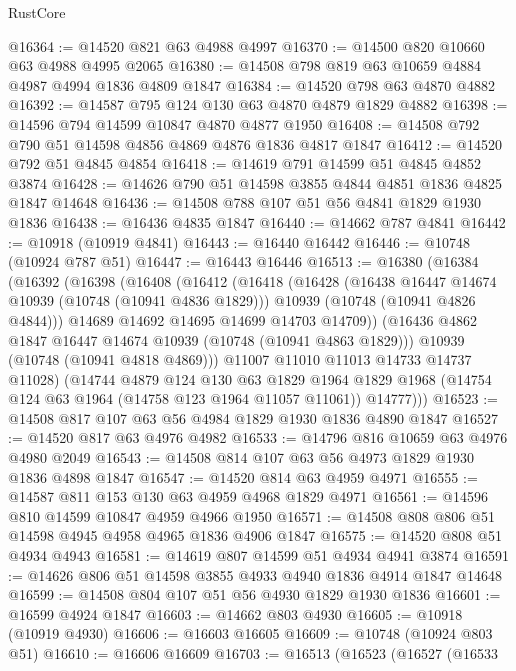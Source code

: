 \begin{lexlean}{RustCore}
\begin{coremodule}
@16364 := @14520 @821 @63 @4988 @4997
@16370 := @14500 @820 @10660 @63 @4988 @4995 @2065
@16380 := @14508 @798 @819 @63 @10659 @4884 @4987 @4994 @1836 @4809 @1847
@16384 := @14520 @798 @63 @4870 @4882
@16392 := @14587 @795 @124 @130 @63 @4870 @4879 @1829 @4882
@16398 := @14596 @794 @14599 @10847 @4870 @4877 @1950
@16408 := @14508 @792 @790 @51 @14598 @4856 @4869 @4876 @1836 @4817 @1847
@16412 := @14520 @792 @51 @4845 @4854
@16418 := @14619 @791 @14599 @51 @4845 @4852 @3874
@16428 := @14626 @790 @51 @14598 @3855 @4844 @4851 @1836 @4825 @1847 @14648
@16436 := @14508 @788 @107 @51 @56 @4841 @1829 @1930 @1836
@16438 := @16436 @4835 @1847
@16440 := @14662 @787 @4841
@16442 := @10918 (@10919 @4841)
@16443 := @16440 @16442
@16446 := @10748 (@10924 @787 @51)
@16447 := @16443 @16446
@16513 := @16380
    (@16384
      (@16392
        (@16398
          (@16408
            (@16412
              (@16418
                (@16428
                  (@16438 @16447 @14674 @10939 (@10748 (@10941 @4836 @1829)))
                  @10939
                  (@10748 (@10941 @4826 @4844)))
                @14689
                @14692
                @14695
                @14699
                @14703
                @14709))
            (@16436 @4862 @1847 @16447 @14674 @10939 (@10748 (@10941 @4863 @1829)))
            @10939
            (@10748 (@10941 @4818 @4869)))
          @11007
          @11010
          @11013
          @14733
          @14737
          @11028)
        (@14744
          @4879
          @124
          @130
          @63
          @1829
          @1964
          @1829
          @1968
          (@14754 @124 @63 @1964 (@14758 @123 @1964 @11057 @11061))
          @14777)))
@16523 := @14508 @817 @107 @63 @56 @4984 @1829 @1930 @1836 @4890 @1847
@16527 := @14520 @817 @63 @4976 @4982
@16533 := @14796 @816 @10659 @63 @4976 @4980 @2049
@16543 := @14508 @814 @107 @63 @56 @4973 @1829 @1930 @1836 @4898 @1847
@16547 := @14520 @814 @63 @4959 @4971
@16555 := @14587 @811 @153 @130 @63 @4959 @4968 @1829 @4971
@16561 := @14596 @810 @14599 @10847 @4959 @4966 @1950
@16571 := @14508 @808 @806 @51 @14598 @4945 @4958 @4965 @1836 @4906 @1847
@16575 := @14520 @808 @51 @4934 @4943
@16581 := @14619 @807 @14599 @51 @4934 @4941 @3874
@16591 := @14626 @806 @51 @14598 @3855 @4933 @4940 @1836 @4914 @1847 @14648
@16599 := @14508 @804 @107 @51 @56 @4930 @1829 @1930 @1836
@16601 := @16599 @4924 @1847
@16603 := @14662 @803 @4930
@16605 := @10918 (@10919 @4930)
@16606 := @16603 @16605
@16609 := @10748 (@10924 @803 @51)
@16610 := @16606 @16609
@16703 := @16513
    (@16523
      (@16527
        (@16533

\end{coremodule}
\end{lexlean}

